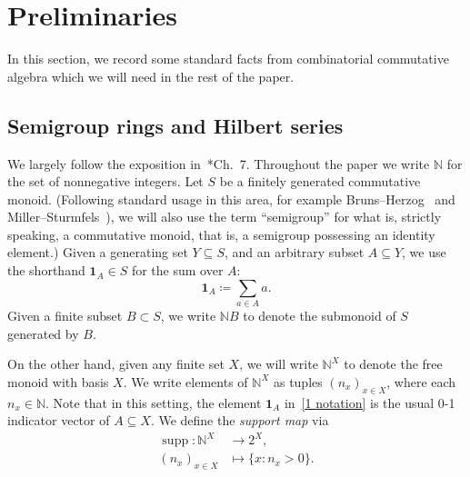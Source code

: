 \documentclass[noamsfonts,10pt]{amsart}
\newcommand{\N}{\mathbb{N}}
\DeclareMathOperator{\supp}{supp}
\newcommand{\1}{\mathbf{1}}
\theoremstyle{plain}
\theoremstyle{definition}
\numberwithin{equation}{section}
\begin{document}
\section{Preliminaries}
\label{sec:preliminaries}

In this section, we record some standard facts from combinatorial commutative algebra which we will need in the rest of the paper.

\subsection*{Semigroup rings and Hilbert series}

We largely follow the exposition in~\cite{MillerSturmfels}*{Ch.~7}.
Throughout the paper we write $\N$ for the set of nonnegative integers.
Let $S$ be a finitely generated commutative monoid.
(Following standard usage in this area, for example Bruns--Herzog~\cite{BrunsHerzog} and Miller--Sturmfels~\cite{MillerSturmfels}), we will also use the term ``semigroup'' for what is, strictly speaking, a commutative monoid, that is, a semigroup possessing an identity element.)
Given a generating set $Y \subseteq S$, and an arbitrary subset $A \subseteq Y$, we use the shorthand $\1_A \in S$ for the sum over $A$:
\begin{equation}
    \label{1 notation}
    \1_{A} \coloneqq \sum_{a \in A} a.
\end{equation}
Given a finite subset $B \subset S$, we write $\N B$ to denote the submonoid of $S$ generated by $B$.

On the other hand, given any finite set $X$, we will write $\N^X$ to denote the free monoid with basis $X$.
We write elements of $\N^X$ as tuples $(n_x)_{x \in X}$, where each $n_x \in \N$.
Note that in this setting, the element $\1_A$ in~\eqref{1 notation} is the usual 0-1 indicator vector of $A \subseteq X$.
We define the \emph{support map} via
\begin{equation}
    \label{supp definition}
    \begin{split}
        \supp : \N^X &\longrightarrow 2^X , \\
        (n_x)_{x \in X} & \longmapsto \{ x : n_x > 0 \}.
    \end{split}
\end{equation}
\end{document}
